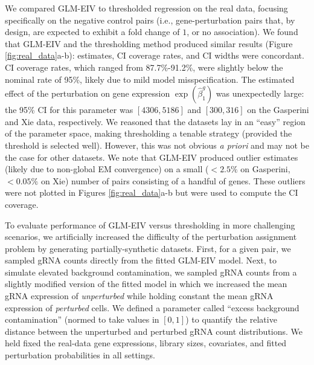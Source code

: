 \documentclass[12pt]{article}
\begin{document}
We compared GLM-EIV to thresholded regression on the real data, focusing specifically on the negative control pairs (i.e., gene-perturbation pairs that, by design, are expected to exhibit a fold change of $1$, or no association). We found that GLM-EIV and the thresholding method produced similar results (Figure \ref{fig:real_data}a-b): estimates, CI coverage rates, and CI widths were concordant. CI coverage rates, which ranged from 87.7\%-91.2\%, were slightly below the nominal rate of 95\%, likely due to mild model misspecification. The estimated effect of the perturbation on gene expression $\exp(\hat{\beta}_1^g)$ was unexpectedly large: the 95\% CI for this parameter was $[4306, 5186]$ and $[300, 316]$ on the Gasperini and Xie data, respectively. We reasoned that the datasets lay in an ``easy'' region of the parameter space, making thresholding a tenable strategy (provided the threshold is selected well). However, this was not obvious \textit{a priori} and may not be the case for other datasets. We note that GLM-EIV produced outlier estimates (likely due to non-global EM convergence) on a small ($< 2.5 \%$ on Gasperini, $<0.05\%$ on Xie) number of pairs consisting of a handful of genes. These outliers were not plotted in Figures \ref{fig:real_data}a-b but were used to compute the CI coverage.

To evaluate performance of GLM-EIV versus thresholding in more challenging scenarios, we artificially increased the difficulty of the perturbation assignment problem by generating partially-synthetic datasets. First, for a given pair, we sampled gRNA counts directly from the fitted GLM-EIV model. Next, to simulate elevated background contamination, we sampled gRNA counts from a slightly modified version of the fitted model in which we increased the mean gRNA expression of \textit{unperturbed} while holding constant the mean gRNA expression of \textit{perturbed} cells. We defined a parameter called ``excess background contamination'' (normed to take values in $[0,1]$) to quantify the relative distance between the unperturbed and perturbed gRNA count distributions.  We held fixed the real-data gene expressions, library sizes, covariates, and fitted perturbation probabilities in all settings.
\end{document}
